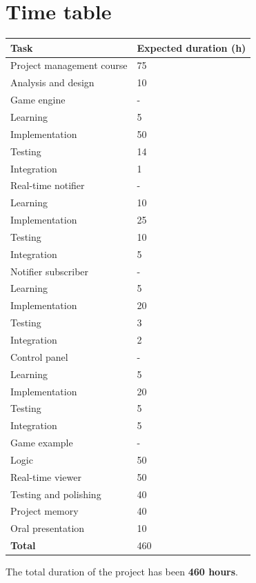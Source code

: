 \documentclass[a4paper,11pt,titlepage,abstract,numbers=noenddot,automark,mnsy,intlimits,rgb,dvipsnames]{report}
\begin{document}
\section{Time table}
\label{time_table}
\begin{center}
\begin{tabular}{l | l}
\textbf{Task} & \textbf{Expected duration (h)}\\
\hline
Project management course & 75\\
\hline
Analysis and design & 10\\
\hline
Game engine & -\\
\hspace{1em}
Learning & 5\\
\hspace{1em}
Implementation & 50\\
\hspace{1em}
Testing & 14\\
\hspace{1em}
Integration & 1\\
\hline
Real-time notifier & -\\
\hspace{1em}
Learning & 10\\
\hspace{1em}
Implementation & 25\\
\hspace{1em}
Testing & 10\\
\hspace{1em}
Integration & 5\\
\hline
Notifier subscriber & -\\
\hspace{1em}
Learning & 5\\
\hspace{1em}
Implementation & 20\\
\hspace{1em}
Testing & 3\\
\hspace{1em}
Integration & 2\\
\hline
Control panel & -\\
\hspace{1em}
Learning & 5\\
\hspace{1em}
Implementation & 20\\
\hspace{1em}
Testing & 5\\
\hspace{1em}
Integration & 5\\
\hline
Game example & -\\
\hspace{1em}
Logic & 50\\
\hspace{1em}
Real-time viewer & 50\\
\hline
Testing and polishing & 40\\
\hline
Project memory & 40\\
\hline
Oral presentation & 10\\
\hline
\hline
\textbf{Total} & 460\\
\end{tabular}
\end{center}
The total duration of the project has been \textbf{460 hours}.
\end{document}
